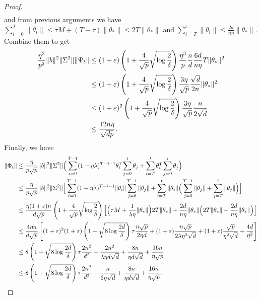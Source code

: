 \begin{proof}
\begin{align*}
    \end{align*}
    and from previous arguments we have $\sum_{i=0}^T \|\theta_i\| \leq \tau M + (T-\tau) \|\theta_*\| \leq 2T \|\theta_*\|$ and $\sum_{i=T}^t \|\theta_i\| \leq \frac{2d}{n\eta}\|\theta_*\|$. Combine them to get 
    \begin{align*}
        \frac{\eta^3}{p^2} \|b\|^2 \|\Sigma^2\| \|\Psi_t\| & \leq (1+\varepsilon) \left(1 + \frac{4}{\sqrt p}\sqrt{\log\frac{2}{\delta}}\right) \frac{\eta^3}{p} \frac{n}{d} \frac{6d}{n\eta} T \|\theta_*\|^2 \\
        & \leq (1+\varepsilon) \left(1 + \frac{4}{\sqrt p}\sqrt{\log\frac{2}{\delta}}\right) \frac{3\eta}{\sqrt{p}} \frac{\sqrt{d}}{2n} \|\theta_*\|^2 \\
        & \leq (1+\varepsilon)^2 \left(1 + \frac{4}{\sqrt p}\sqrt{\log\frac{2}{\delta}}\right) \frac{3\eta}{\sqrt{p}} \frac{n}{2\sqrt{d}} \\
        & \leq \frac{12n\eta}{\sqrt{dp}}.
    \end{align*}
    Finally, we have 
    \begin{align*}
        \|\Phi_t\| & \leq \frac{\eta}{p\sqrt{p}} \|b\|^2 \|\Sigma^2\| \Big( \sum_{i=0}^{T-1} (1-\eta\lambda)^{T-i-1}\theta_i\transpose  \sum_{j=0}^i \theta_j + \sum_{i=T}^t \theta_i\transpose  \sum_{j=0}^i \theta_j \Big) \\
        & \leq \frac{\eta}{p\sqrt{p}} \|b\|^2 \|\Sigma^2\| \Big[ \sum_{i=0}^{T-1} (1-\eta\lambda)^{T-i-1} \|\theta_i\|  \sum_{j=0}^{T-1} \|\theta_j\| + \sum_{i=T}^t \|\theta_i\|  \Big( \sum_{j=0}^{T-1} \|\theta_j\| + \sum_{j=T}^i \|\theta_j\| \Big) \Big] \\
        & \leq \frac{\eta(1+\eps)n}{d\sqrt{p}} \left(1 + \frac{4}{\sqrt p}\sqrt{\log\frac{2}{\delta}}\right) \Big[ \Big( \tau M + \frac{1}{\lambda\eta} \|\theta_*\| \Big) 2T \|\theta_*\| + \frac{2d}{n\eta}\|\theta_*\|  \Big( 2T \|\theta_*\| + \frac{2d}{n\eta}\|\theta_*\| \Big) \Big] \\
        & \leq \frac{4\eta n}{d\sqrt{p}} \left[ (1+\eps)^2 (1+\eps)\left(1 + \sqrt{8\log\frac{2d}{\delta}}\right) \tau \frac{n\sqrt{p}}{2\eta d} + (1+\eps) \frac{n\sqrt{p}}{2\lambda\eta^2\sqrt{d}} + (1+\eps) \frac{\sqrt{p}}{\eta^2\sqrt{d}} + \frac{4d}{\eta^2} \right] \\
        & \leq 8\left(1 + \sqrt{8\log\frac{2d}{\delta}}\right) \tau \frac{2n^2}{d^2} + \frac{2n^2}{\lambda\eta d\sqrt{d}} + \frac{8n}{\eta d\sqrt{d}} + \frac{16n}{\eta\sqrt{p}} \\
        & \leq 8\left(1 + \sqrt{8\log\frac{2d}{\delta}}\right) \tau \frac{2n^2}{d^2} + \frac{n}{6\eta \sqrt{d}} + \frac{8n}{\eta d\sqrt{d}} + \frac{16n}{\eta\sqrt{p}}.

\end{align*}
\end{proof}
